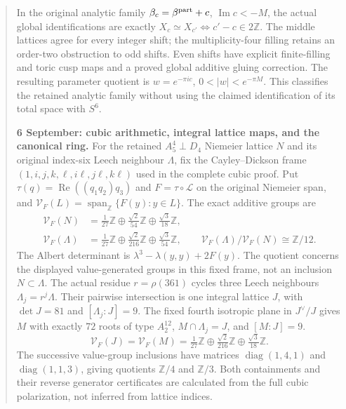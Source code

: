 \documentclass[11pt,letterpaper]{article}
\theoremstyle{definition}
\theoremstyle{remark}
\begin{document}
\begin{abstract}
In the original analytic family $\beta_c=\beta^{\rm part}+c$,
$\operatorname{Im}c<-M$, the actual global identifications are exactly
$X_c\simeq X_{c'}\Longleftrightarrow c'-c\in2\mathbb Z$.
The middle lattices agree for every integer shift; the multiplicity-four
filling retains an order-two obstruction to odd shifts. Even shifts have
explicit finite-filling and toric cusp maps and a proved global additive
gluing correction. The resulting parameter quotient is
$w=e^{-\pi ic}$, $0<|w|<e^{-\pi M}$.
This classifies the retained analytic family without using the claimed
identification of its total space with $S^6$.


\noindent\textbf{6 September: cubic arithmetic, integral lattice maps, and the canonical ring.}
For the retained $A_5^4\perp D_4$ Niemeier lattice $N$ and its
original index-six Leech neighbour $\Lambda$, fix the Cayley--Dickson
frame $(1,i,j,k,\ell,i\ell,j\ell,k\ell)$ used in the complete cubic
proof. Put $\tau(q)=\operatorname{Re}((q_1q_2)q_3)$ and
$F=\tau\circ\mathcal L$ on the original Niemeier span,
and $\mathcal V_F(L)=\operatorname{span}_{\mathbb Z}\{F(y):y\in L\}$.
The exact additive groups are
\[
\begin{aligned}
 \mathcal V_F(N)&=\tfrac1{27}\mathbb Z\oplus
       \tfrac{\sqrt2}{54}\mathbb Z\oplus\tfrac{\sqrt3}{18}\mathbb Z,\\
 \mathcal V_F(\Lambda)&=\tfrac1{27}\mathbb Z\oplus
       \tfrac{\sqrt2}{216}\mathbb Z\oplus\tfrac{\sqrt3}{54}\mathbb Z,
 \qquad \mathcal V_F(\Lambda)/\mathcal V_F(N)\cong\mathbb Z/12.
\end{aligned}
\]
The Albert determinant is $\lambda^3-\lambda(y,y)+2F(y)$.
The quotient concerns the displayed value-generated groups in this fixed
frame, not an inclusion $N\subset\Lambda$. The actual residue
$r=\rho(361)$ cycles three Leech neighbours $\Lambda_j=r^j\Lambda$.
Their pairwise intersection is one integral lattice $J$, with
$\det J=81$ and $[\Lambda_j:J]=9$. The fixed fourth isotropic plane
in $J^\vee/J$ gives $M$ with exactly $72$ roots of type $A_2^{12}$,
$M\cap\Lambda_j=J$, and $[M:J]=9$.
\[
 \mathcal V_F(J)=\mathcal V_F(M)
 =\tfrac1{27}\mathbb Z\oplus\tfrac{\sqrt2}{216}\mathbb Z
                         \oplus\tfrac{\sqrt3}{18}\mathbb Z.
\]
The successive value-group inclusions have matrices
$\operatorname{diag}(1,4,1)$ and $\operatorname{diag}(1,1,3)$,
giving quotients $\mathbb Z/4$ and $\mathbb Z/3$.
Both containments and their reverse generator certificates are calculated
from the full cubic polarization, not inferred from lattice indices.


\end{abstract}
\end{document}
